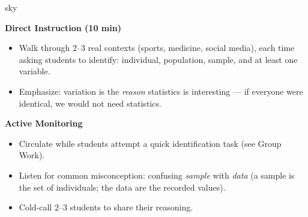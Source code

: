 \documentclass[10pt]{article}
\begin{document}
\begin{skillbox}{sky}
\begin{minipage}[t]{0.48\linewidth}
    \textbf{Direct Instruction (10 min)}
    \begin{itemize}
        \item Walk through 2--3 real contexts (sports, medicine, social media), each time asking students to identify: individual, population, sample, and at least one variable.
        \item Emphasize: variation is the \textit{reason} statistics is interesting --- if everyone were identical, we would not need statistics.
    \end{itemize}
\end{minipage}
\hfill
\begin{minipage}[t]{0.48\linewidth}
    \textbf{Active Monitoring}
    \begin{itemize}
        \item Circulate while students attempt a quick identification task (see Group Work).
        \item Listen for common misconception: confusing \textit{sample} with \textit{data} (a sample is the set of individuals; the data are the recorded values).
        \item Cold-call 2--3 students to share their reasoning.
    \end{itemize}
\end{minipage}
\end{skillbox}
\end{document}
